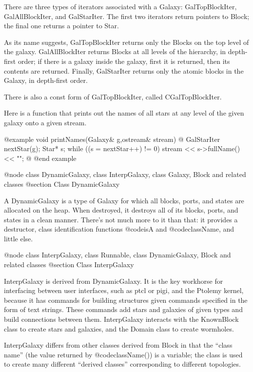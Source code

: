 There are three types of iterators associated with a Galaxy:
GalTopBlockIter, GalAllBlockIter, and GalStarIter.  The first
two iterators return pointers to Block; the final one returns
a pointer to Star.

As its name suggests, GalTopBlockIter returns only the Blocks
on the top level of the galaxy.  GalAllBlockIter returns
Blocks at all levels of the hierarchy, in depth-first order;
if there is a galaxy inside the galaxy, first it is returned,
then its contents are returned.  Finally, GalStarIter returns
only the atomic blocks in the Galaxy, in depth-first order.

There is also a const form of GalTopBlockIter, called CGalTopBlockIter.

Here is a function that prints out the names of all stars at any
level of the given galaxy onto a given stream.

@example
void printNames(Galaxy& g,ostream& stream) @{
    GalStarIter nextStar(g);
    Star* s;
    while ((s = nextStar++) != 0)
        stream << s->fullName() << "\n";
@}
@end example

@node class DynamicGalaxy, class InterpGalaxy, class Galaxy, Block and related classes
@section Class DynamicGalaxy

A DynamicGalaxy is a type of Galaxy for which all blocks, ports, and
states are allocated on the heap.  When destroyed, it destroys all of
its blocks, ports, and states in a clean manner.  There's not much
more to it than that: it provides a destructor, class identification
functions @code{isA} and @code{className}, and little else.

@node class InterpGalaxy, class Runnable, class DynamicGalaxy, Block and related classes
@section Class InterpGalaxy

InterpGalaxy is derived from DynamicGalaxy.  It is the key workhorse
for interfacing between user interfaces, such as ptcl or pigi, and
the Ptolemy kernel, because it has commands for building structures
given commands specified in the form of text strings.  These commands
add stars and galaxies of given types and build connections between
them.  InterpGalaxy interacts with the KnownBlock class to create
stars and galaxies, and the Domain class to create wormholes.

InterpGalaxy differs from other classes derived from Block in that
the ``class name'' (the value returned by @code{className()}) is a
variable; the class is used to create many different ``derived classes''
corresponding to different topologies.


